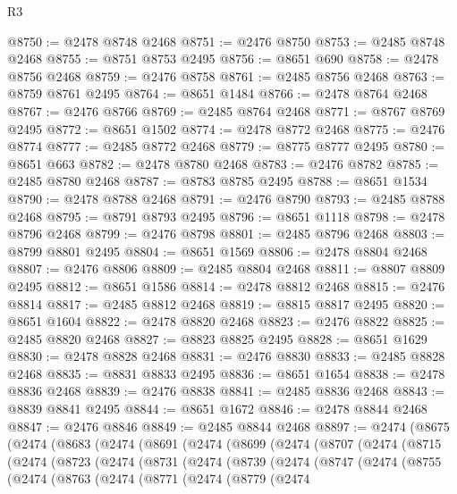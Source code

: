 \begin{lexlean}{R3}
\begin{coremodule}
@8750 := @2478 @8748 @2468
@8751 := @2476 @8750
@8753 := @2485 @8748 @2468
@8755 := @8751 @8753 @2495
@8756 := @8651 @690
@8758 := @2478 @8756 @2468
@8759 := @2476 @8758
@8761 := @2485 @8756 @2468
@8763 := @8759 @8761 @2495
@8764 := @8651 @1484
@8766 := @2478 @8764 @2468
@8767 := @2476 @8766
@8769 := @2485 @8764 @2468
@8771 := @8767 @8769 @2495
@8772 := @8651 @1502
@8774 := @2478 @8772 @2468
@8775 := @2476 @8774
@8777 := @2485 @8772 @2468
@8779 := @8775 @8777 @2495
@8780 := @8651 @663
@8782 := @2478 @8780 @2468
@8783 := @2476 @8782
@8785 := @2485 @8780 @2468
@8787 := @8783 @8785 @2495
@8788 := @8651 @1534
@8790 := @2478 @8788 @2468
@8791 := @2476 @8790
@8793 := @2485 @8788 @2468
@8795 := @8791 @8793 @2495
@8796 := @8651 @1118
@8798 := @2478 @8796 @2468
@8799 := @2476 @8798
@8801 := @2485 @8796 @2468
@8803 := @8799 @8801 @2495
@8804 := @8651 @1569
@8806 := @2478 @8804 @2468
@8807 := @2476 @8806
@8809 := @2485 @8804 @2468
@8811 := @8807 @8809 @2495
@8812 := @8651 @1586
@8814 := @2478 @8812 @2468
@8815 := @2476 @8814
@8817 := @2485 @8812 @2468
@8819 := @8815 @8817 @2495
@8820 := @8651 @1604
@8822 := @2478 @8820 @2468
@8823 := @2476 @8822
@8825 := @2485 @8820 @2468
@8827 := @8823 @8825 @2495
@8828 := @8651 @1629
@8830 := @2478 @8828 @2468
@8831 := @2476 @8830
@8833 := @2485 @8828 @2468
@8835 := @8831 @8833 @2495
@8836 := @8651 @1654
@8838 := @2478 @8836 @2468
@8839 := @2476 @8838
@8841 := @2485 @8836 @2468
@8843 := @8839 @8841 @2495
@8844 := @8651 @1672
@8846 := @2478 @8844 @2468
@8847 := @2476 @8846
@8849 := @2485 @8844 @2468
@8897 := @2474
    (@8675
      (@2474
        (@8683
          (@2474
            (@8691
              (@2474
                (@8699
                  (@2474
                    (@8707
                      (@2474
                        (@8715
                          (@2474
                            (@8723
                              (@2474
                                (@8731
                                  (@2474
                                    (@8739
                                      (@2474
                                        (@8747
                                          (@2474
                                            (@8755
                                              (@2474
                                                (@8763
                                                  (@2474
                                                    (@8771
                                                      (@2474
                                                        (@8779
                                                          (@2474

\end{coremodule}
\end{lexlean}
